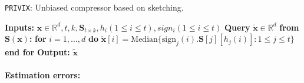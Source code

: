 \begin{algorithm}[H]
\caption{\texttt{PRIVIX}\cite{li2019privacy}: Unbiased compressor based on sketching. }\label{Alg:csketch}
\begin{algorithmic}[1]
\State \textbf{Inputs:} $\boldsymbol{x}\in\mathbb{R}^{d}, t, k, \mathbf{S}_{t\times k}, h_i (1\leq i\leq t), sign_i (1\leq i\leq t)$
\State \textbf{Query} $\tilde{\boldsymbol{x}}\in\mathbb{R}^d$ \textbf{from $\mathbf{S(\boldsymbol{x})}$:}
\State \textbf{for} $i=1,\ldots,d$ \textbf{do}
\State \quad\quad ${\tilde{\boldsymbol{x}}}[i]=\text{Median}\{\text{sign}_j(i).\mathbf{S}[j][h_j(i)]:1\leq j\leq t\}$ 
\State \textbf{end for}
\State \textbf{Output:} ${\tilde{\boldsymbol{x}}}$
\vspace{- 0.1cm}
\end{algorithmic}
\end{algorithm}
\paragraph{Estimation errors:}

